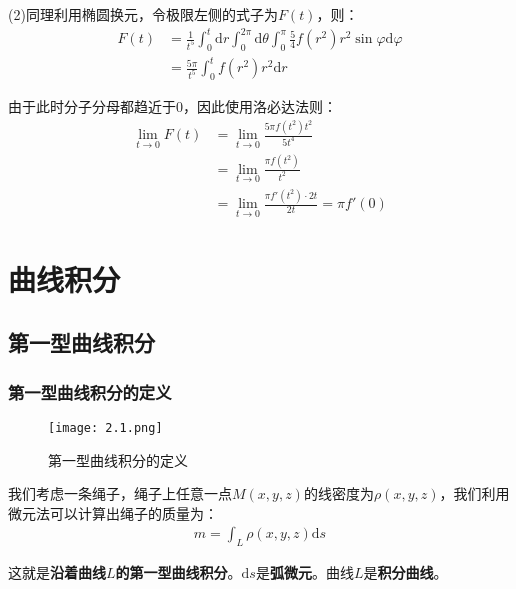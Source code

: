 \documentclass{ctexart}
\let\oldtextbf\textbf
\renewcommand{\textbf}[1]{\textcolor{brown!50!red}{\oldtextbf{#1}}}
\begin{document}
(2)同理利用椭圆换元，令极限左侧的式子为$F(t)$，则：
\begin{align*}
    F(t)&=\frac{1}{t^5}\int_0^t\mathrm{d}r\int_0^{2\pi}\mathrm{d}\theta\int_0^\pi \frac{5}{4}f(r^2)r^2\sin\varphi \mathrm{d}\varphi\\
&=\frac{5\pi}{t^5}\int_0^t f(r^2)r^2\mathrm{d}r
\end{align*}

由于此时分子分母都趋近于0，因此使用洛必达法则：
\begin{align*}
    \lim_{t\to 0}F(t)&=\lim_{t\to 0}\frac{5\pi f(t^2)t^2}{5t^4}\\
    &=\lim_{t\to 0}\frac{\pi f(t^2)}{t^2}\\
    &=\lim_{t\to 0}\frac{\pi f'(t^2)\cdot 2t}{2 t}=\pi f'(0)
\end{align*}
\section{曲线积分}
\subsection{第一型曲线积分}
\subsubsection{第一型曲线积分的定义}
\begin{figure}[H]    
\centering     
\renewcommand{\figurename}{图}     
\renewcommand{\thefigure}{2.1}    
\begin{myimagebox}[width=0.4\textwidth] %
\texttt{[image: 2.1.png]} %
\end{myimagebox}     
\caption{\label{fig:2.1}第一型曲线积分的定义}   
\end{figure}

我们考虑一条绳子，绳子上任意一点$M(x,y,z)$的线密度为$\rho(x,y,z)$，我们利用微元法可以计算出绳子的质量为：
\begin{align*}
    m=\int_L \rho(x,y,z)\mathrm{d}s\tag{2-1}
\end{align*}

这就是\textbf{\color{brown!50!red}沿着曲线$L$的第一型曲线积分}。$\mathrm{d}s$是\textbf{\color{brown!50!red}弧微元}。曲线$L$是\textbf{\color{brown!50!red}积分曲线}。
\end{document}

